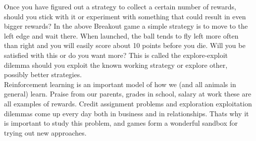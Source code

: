 \documentclass[twoside,letterpaper]{article}
\begin{document}
{\bigskip
Once you have figured out a strategy to collect a certain number of rewards, should you stick with it or experiment with something that could result in even bigger rewards? In the above Breakout game a simple strategy is to move to the left edge and wait there. When launched, the ball tends to fly left more often than right and you will easily score about 10 points before you die. Will you be satisfied with this or do you want more? This is called the explore-exploit dilemma should you exploit the known working strategy or explore other, possibly better strategies.\\
\bigskip
Reinforcement learning is an important model of how we (and all animals in general) learn. Praise from our parents, grades in school, salary at work these are all examples of rewards. Credit assignment problems and exploration exploitation dilemmas come up every day both in business and in relationships. Thats why it is important to study this problem, and games form a wonderful sandbox for trying out new approaches.}
\end{document}
